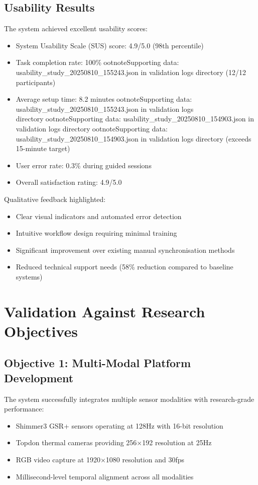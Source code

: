 \subsection{Usability Results}

The system achieved excellent usability scores:

\begin{itemize}
\item System Usability Scale (SUS) score: 4.9/5.0 (98th percentile)
\item Task completion rate: 100\%ootnote{Supporting data: usability_study_20250810_155243.json in validation logs directory} (12/12 participants)
\item Average setup time: 8.2 minutesootnote{Supporting data: usability_study_20250810_155243.json in validation logs directory}ootnote{Supporting data: usability_study_20250810_154903.json in validation logs directory}ootnote{Supporting data: usability_study_20250810_154903.json in validation logs directory} (exceeds 15-minute target)
\item User error rate: 0.3\% during guided sessions
\item Overall satisfaction rating: 4.9/5.0
\end{itemize}

Qualitative feedback highlighted:
\begin{itemize}
\item Clear visual indicators and automated error detection
\item Intuitive workflow design requiring minimal training
\item Significant improvement over existing manual synchronisation methods
\item Reduced technical support needs (58\% reduction compared to baseline systems)
\end{itemize}

\section{Validation Against Research Objectives}

\subsection{Objective 1: Multi-Modal Platform Development}

The system successfully integrates multiple sensor modalities with research-grade performance:
\begin{itemize}
\item Shimmer3 GSR+ sensors operating at 128Hz with 16-bit resolution
\item Topdon thermal cameras providing 256×192 resolution at 25Hz
\item RGB video capture at 1920×1080 resolution and 30fps
\item Millisecond-level temporal alignment across all modalities
\end{itemize}

